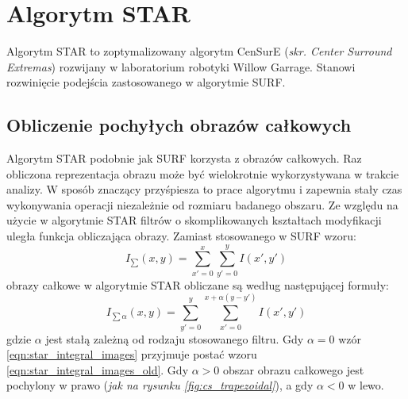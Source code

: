 \section{Algorytm STAR}
Algorytm STAR to zoptymalizowany algorytm {CenSurE} (\textit{skr. Center Surround Extremas}) \cite{CENS} rozwijany w laboratorium robotyki Willow Garrage. Stanowi rozwinięcie podejścia zastosowanego w  algorytmie SURF. 


\subsection{Obliczenie pochyłych obrazów całkowych}

Algorytm STAR podobnie jak SURF korzysta z obrazów całkowych. Raz obliczona reprezentacja obrazu może być wielokrotnie wykorzystywana w trakcie analizy. W sposób znaczący przyśpiesza to prace algorytmu i zapewnia stały czas wykonywania operacji niezależnie od rozmiaru badanego obszaru. Ze względu na użycie w algorytmie STAR filtrów o skomplikowanych kształtach modyfikacji uległa funkcja obliczająca obrazy. Zamiast stosowanego w SURF wzoru:
\begin{equation}
I_{\sum}(x,y) = \sum\limits_{x'=0}^{ x} \sum\limits_{y'=0}^{y} I(x',y')
\label{eqn:star_integral_images_old}
\end{equation}
obrazy całkowe w algorytmie STAR obliczane są według następującej formuły:
\begin{equation}
I_{\sum\alpha}(x,y) = \sum\limits_{y'=0}^{ y} \sum\limits_{x'=0}^{x+\alpha(y-y')} I(x',y')
\label{eqn:star_integral_images}
\end{equation}
gdzie $\alpha$ jest stałą zależną od rodzaju stosowanego filtru. Gdy $\alpha=0$ wzór \ref{eqn:star_integral_images} przyjmuje postać wzoru \ref{eqn:star_integral_images_old}. Gdy $\alpha>0$ obszar obrazu całkowego jest pochylony w prawo (\textit{jak na rysunku \ref{fig:cs_trapezoidal}}), a gdy $\alpha<0$ w lewo. 

